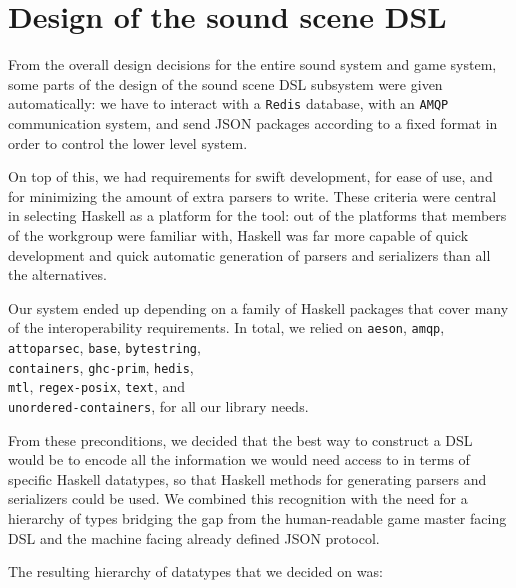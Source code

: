 \section{Design of the sound scene DSL}
\label{sec:design-sound-spec}

From the overall design decisions for the entire sound system and game
system, some parts of the design of the sound scene DSL subsystem were
given automatically: we have to interact with a \texttt{Redis} database, with
an \texttt{AMQP} communication system, and send JSON packages according to a
fixed format in order to control the lower level system.

On top of this, we had requirements for swift development, for ease of
use, and for minimizing the amount of extra parsers to write. These
criteria were central in selecting Haskell as a platform for the tool:
out of the platforms that members of the workgroup were familiar with,
Haskell was far more capable of quick development and quick automatic
generation of parsers and serializers than all the alternatives. 

Our system ended up depending on a family of Haskell packages that
cover many of the interoperability requirements. In total, we relied
on 
\texttt{aeson}\cite{aeson}, 
\texttt{amqp}\cite{amqp}, 
\texttt{attoparsec}\cite{attoparsec}, 
\texttt{base}\cite{haskell}, 
\texttt{bytestring}\cite{bytestring}, \\
\texttt{containers}\cite{containers}, 
\texttt{ghc-prim}\cite{haskell}, 
\texttt{hedis}\cite{hedis}, \\
\texttt{mtl}\cite{mtl}, 
\texttt{regex-posix}\cite{regex-posix}, 
\texttt{text}\cite{text}, and\\
\texttt{unordered-containers}\cite{unordered-containers}, 
for all our library needs.

From these preconditions, we decided that the best way to construct a
DSL would be to encode all the information we would need access to in
terms of specific Haskell datatypes, so that Haskell methods for
generating parsers and serializers could be used. We combined this
recognition with the need for a hierarchy of types bridging the gap
from the human-readable game master facing DSL and the machine facing
already defined JSON protocol.

The resulting hierarchy of datatypes that we decided on was:\nopagebreak

